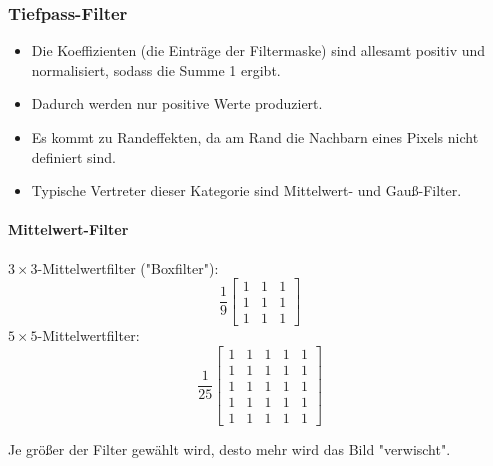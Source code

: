 			\subsubsection{Tiefpass-Filter}
				\begin{itemize}
					\item Die Koeffizienten (\dh die Einträge der Filtermaske) sind allesamt positiv und normalisiert, sodass die Summe \num{1} ergibt.
					\item Dadurch werden nur positive Werte produziert.
					\item Es kommt zu Randeffekten, da am Rand die Nachbarn eines Pixels nicht definiert sind.
					\item Typische Vertreter dieser Kategorie sind Mittelwert- und Gauß-Filter.
				\end{itemize}

				\paragraph{Mittelwert-Filter}
					\( 3 \times 3 \)-Mittelwertfilter ("Boxfilter"):
					\begin{equation*}
						\frac{1}{9}
						\begin{bmatrix}
							1 & 1 & 1 \\
							1 & 1 & 1 \\
							1 & 1 & 1
						\end{bmatrix}
					\end{equation*}
					\indent \( 5 \times 5 \)-Mittelwertfilter:
					\begin{equation*}
						\frac{1}{25}
						\begin{bmatrix}
							1 & 1 & 1 & 1 & 1 \\
							1 & 1 & 1 & 1 & 1 \\
							1 & 1 & 1 & 1 & 1 \\
							1 & 1 & 1 & 1 & 1 \\
							1 & 1 & 1 & 1 & 1
						\end{bmatrix}
					\end{equation*}
					
					Je größer der Filter gewählt wird, desto mehr wird das Bild "verwischt".

